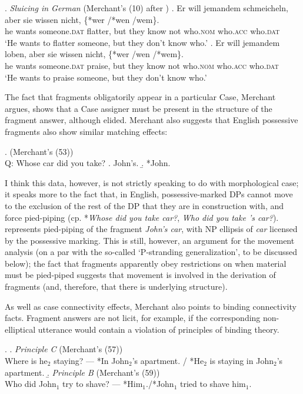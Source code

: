 \documentclass[doublespace]{umthesis}
\begin{document}
\ex. 		{\it Sluicing in German} (Merchant's (10) after \cite{Ro69})
		\ag. Er will jemandem schmeicheln, aber sie wissen nicht, \{*wer /*wen /wem\}.\\
		he wants someone.\textsc{dat} flatter, but they know not who.\textsc{nom} who.\textsc{acc} who.\textsc{dat}\\
		`He wants to flatter someone, but they don't know who.'
		\bg.  Er will jemandem loben, aber sie wissen nicht, \{*wer /wen /*wem\}.\\
			he wants someone.\textsc{dat} praise, but they know not who.\textsc{nom} who.\textsc{acc} who.\textsc{dat}\\
			`He wants to praise someone, but they don't know who.'
			
			
The fact that fragments obligatorily appear in a particular Case, Merchant argues, shows that a Case assigner must be present in the structure of the fragment answer, although elided.	 Merchant also suggests that English possessive fragments also show similar matching effects:

\ex. 		(Merchant's (53))\\
		Q: Whose car did you take?
			\a. John's.
			\b. *John.
			
I think this data, however, is not strictly speaking to do with morphological case; it speaks more to the fact that, in English, possessive-marked DPs cannot move to the exclusion of the rest of the DP that they are in construction with, and force pied-piping (cp. *{\it Whose did you take car?}, {\it *Who did you take 's car?}). \Last[a] represents pied-piping of the fragment {\it John's car}, with NP ellipsis of {\it car} licensed by the possessive marking. This is still, however, an argument for the movement analysis (on a par with the so-called `P-stranding generalization', to be discussed below); the fact that fragments apparently obey restrictions on when material must be pied-piped suggests that movement is involved in the derivation of fragments (and, therefore, that there is underlying structure).

As well as case connectivity effects, Merchant also points to binding connectivity facts. Fragment answers are not licit, for example, if the corresponding non-elliptical utterance would contain a violation of principles of binding theory.

\ex. 		\a. {\it Principle C} (Merchant's (57))\\
			Where is he$_{2}$ staying? --- *In John$_{2}$'s apartment. / *He$_{2}$ is staying in John$_{2}$'s apartment.
		\b. {\it Principle B} (Merchant's (59))\\
				Who did John$_{1}$ try to shave? --- *Him$_{1}$./*John$_{1}$ tried to shave him$_{1}$.
\end{document}
